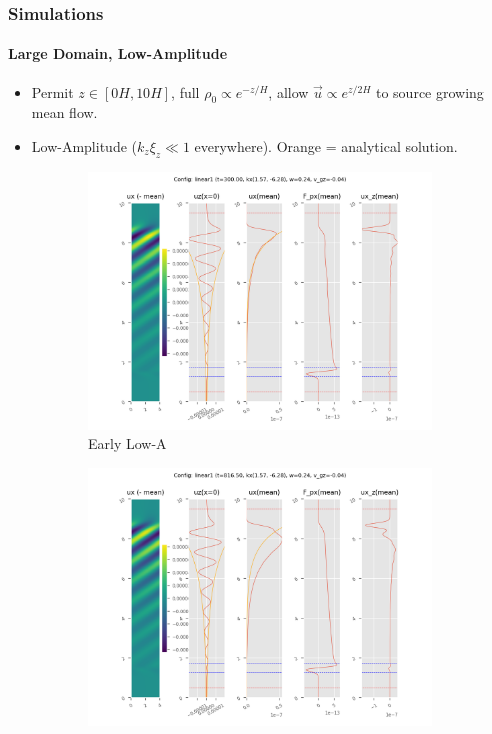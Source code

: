 \documentclass[dvipsnames, 10pt]{beamer}
\begin{document}
\begin{frame}
    \frametitle{Simulations}
    \framesubtitle{Large Domain, Low-Amplitude}

    \begin{itemize}
        \item Permit $z \in [0H, 10H]$, full $\rho_0 \propto e^{-z/H}$, allow
            $\vec{u} \propto e^{z/2H}$ to source growing mean flow.

        \item Low-Amplitude ($k_z\xi_z \ll 1$ everywhere). Orange = analytical
            solution.
    \end{itemize}
    \begin{figure}[t]
        \centering
        \hspace*{-19mm}%
        \begin{subfigure}{0.55\textwidth}
            \centering
            \includegraphics[width=\textwidth]{lin_early.png}
            \caption{Early Low-A}
        \end{subfigure}
        \begin{subfigure}{0.55\textwidth}
            \centering
            \includegraphics[width=\textwidth]{lin_late.png}

\end{subfigure}
\end{figure}
\end{frame}
\end{document}
